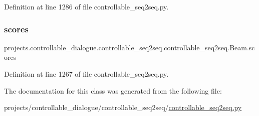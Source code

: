 Definition at line 1286 of file controllable\+\_\+seq2seq.\+py.

\mbox{\label{classprojects_1_1controllable__dialogue_1_1controllable__seq2seq_1_1controllable__seq2seq_1_1Beam_a3f644c74f23d3f49e51bd65b234405d0}} 
\subsubsection{\texorpdfstring{scores}{scores}}
{\footnotesize\ttfamily projects.\+controllable\+\_\+dialogue.\+controllable\+\_\+seq2seq.\+controllable\+\_\+seq2seq.\+Beam.\+scores}



Definition at line 1267 of file controllable\+\_\+seq2seq.\+py.



The documentation for this class was generated from the following file\+:\begin{DoxyCompactItemize}
\item 
projects/controllable\+\_\+dialogue/controllable\+\_\+seq2seq/\hyperlink{controllable__seq2seq_8py}{controllable\+\_\+seq2seq.\+py}\end{DoxyCompactItemize}

